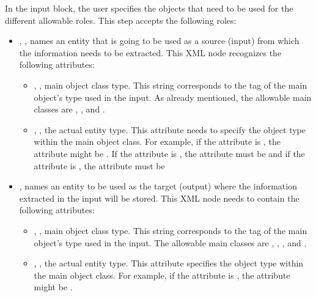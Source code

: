 \vspace{-5mm}
In the  input block, the user specifies the objects that need to
be used for the different allowable roles.
This step accepts the following roles:
\begin{itemize}
\item {}, , names an entity
  that is going to be used as a source (input) from which the information needs
  to be extracted.
  This XML node recognizes the following attributes:
\begin{itemize}
  \item {}, , main object class
    type.
    This string corresponds to the tag of the main object's type used in the
    input.
    As already mentioned, the allowable main classes are ,
    ,  and .
  \item {}, , the actual entity
    type.
    This attribute needs to specify the object type within the main object
    class.
    For example, if the   attribute is , the
     attribute might be . If the   attribute is , the
     attribute must be  and if the   attribute is , the
     attribute must be \xmlString{ }
\end{itemize}
\item {},  names an entity to 
  be used as the target (output) where the information extracted in the input
  will be stored.
  This XML node needs to contain the following attributes:
\begin{itemize}
  \item {}, , main object class
    type.
    This string corresponds to the tag of the main object's type used in the
    input.
    The allowable main classes are , , ,  and .
  \item {}, , the actual entity
    type.
    This attribute specifies the object type within the main object class.
    For example, if the  attribute is 
    , the  attribute might be
    .
\end{itemize}
\end{itemize}
